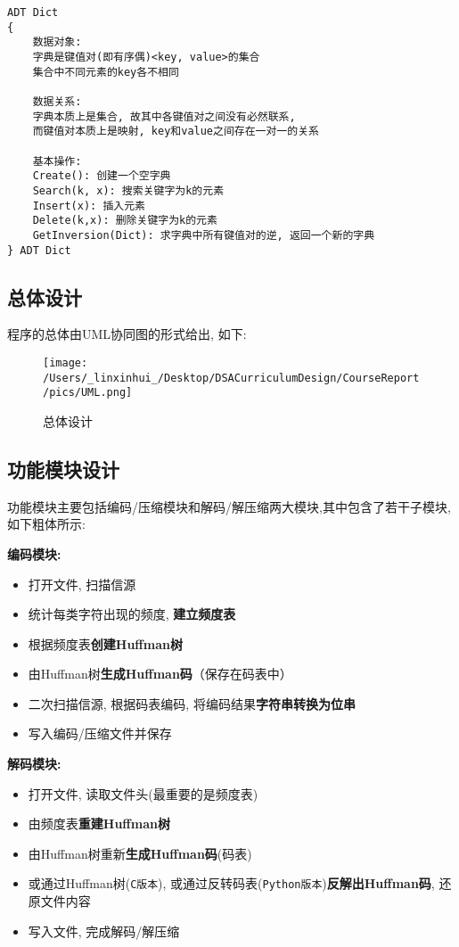 \documentclass[a4paper]{ctexart}
\begin{document}
\begin{verbatim}
ADT Dict
{
    数据对象: 
    字典是键值对(即有序偶)<key, value>的集合
    集合中不同元素的key各不相同

    数据关系: 
    字典本质上是集合, 故其中各键值对之间没有必然联系, 
    而键值对本质上是映射, key和value之间存在一对一的关系

    基本操作:
    Create(): 创建一个空字典
    Search(k, x): 搜索关键字为k的元素
    Insert(x): 插入元素
    Delete(k,x): 删除关键字为k的元素
    GetInversion(Dict): 求字典中所有键值对的逆, 返回一个新的字典
} ADT Dict
\end{verbatim}

\subsection{总体设计}\label{header-n90}

程序的总体由UML协同图的形式给出, 如下:

\begin{figure}[H]
\centering
\texttt{[image: /Users/\_linxinhui\_/Desktop/DSACurriculumDesign/CourseReport/pics/UML.png]}
\caption{总体设计}
\end{figure}

\subsection{功能模块设计}\label{header-n93}

功能模块主要包括编码/压缩模块和解码/解压缩两大模块,其中包含了若干子模块, 如下粗体所示:

\textbf{编码模块:}

\begin{itemize}
\item
  打开文件, 扫描信源
\item
  统计每类字符出现的频度, \textbf{建立频度表}
\item
  根据频度表\textbf{创建Huffman树}
\item
  由Huffman树\textbf{生成Huffman码}（保存在码表中）
\item
  二次扫描信源, 根据码表编码, 将编码结果\textbf{字符串转换为位串}
\item
  写入编码/压缩文件并保存
\end{itemize}

\textbf{解码模块:}

\begin{itemize}
\item
  打开文件, 读取文件头(最重要的是频度表)
\item
  由频度表\textbf{重建Huffman树}
\item
  由Huffman树重新\textbf{生成Huffman码}(码表)
\item
  或通过Huffman树(\texttt{C版本}), 或通过反转码表(\texttt{Python版本})\textbf{反解出Huffman码}, 还原文件内容
\item
  写入文件, 完成解码/解压缩
\end{itemize}
\end{document}
